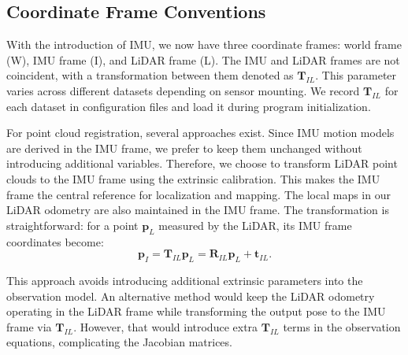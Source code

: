 \subsection{Coordinate Frame Conventions}
With the introduction of IMU, we now have three coordinate frames: world frame (W), IMU frame (I), and LiDAR frame (L). The IMU and LiDAR frames are not coincident, with a transformation between them denoted as $\bm{T}_{IL}$. This parameter varies across different datasets depending on sensor mounting. We record $\bm{T}_{IL}$ for each dataset in configuration files and load it during program initialization.

For point cloud registration, several approaches exist. Since IMU motion models are derived in the IMU frame, we prefer to keep them unchanged without introducing additional variables. Therefore, we choose to transform LiDAR point clouds to the IMU frame using the extrinsic calibration. This makes the IMU frame the central reference for localization and mapping. The local maps in our LiDAR odometry are also maintained in the IMU frame. The transformation is straightforward: for a point $\bm{p}_L$ measured by the LiDAR, its IMU frame coordinates become:
\begin{equation}\label{key}
	\bm{p}_{I} = \bm{T}_{IL} \bm{p}_L = \bm{R}_{IL} \bm{p}_L + \bm{t}_{IL}.
\end{equation}

This approach avoids introducing additional extrinsic parameters into the observation model. An alternative method would keep the LiDAR odometry operating in the LiDAR frame while transforming the output pose to the IMU frame via $\bm{T}_{IL}$. However, that would introduce extra $\bm{T}_{IL}$ terms in the observation equations, complicating the Jacobian matrices.

